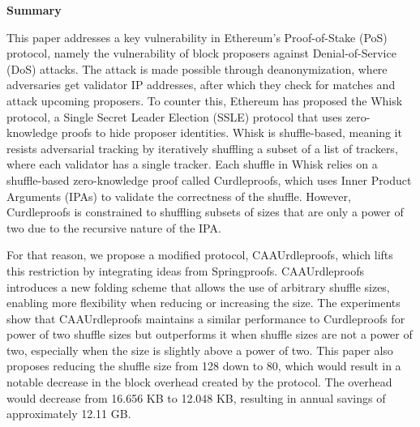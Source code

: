 \onecolumn     %
\thispagestyle{empty}

\begin{center}
    \begin{tcolorbox}[
        width=\dimexpr\paperwidth - 2in\relax,  %
        colback=white,                          %
        colframe=white,                         %
        left=60pt, right=60pt, top=10pt, bottom=10pt, %
        boxrule=0.8pt, %
        fontupper=\large
    ]
        \textbf{\large Summary}%

        This paper addresses a key vulnerability in Ethereum’s Proof-of-Stake (PoS) protocol, namely the vulnerability of block proposers against Denial-of-Service (DoS) attacks.
        The attack is made possible through deanonymization, where adversaries get validator IP addresses, after which they check for matches and attack upcoming proposers.
        To counter this, Ethereum has proposed the Whisk protocol, a Single Secret Leader Election (SSLE) protocol that uses zero-knowledge proofs to hide proposer identities.
        Whisk is shuffle-based, meaning it resists adversarial tracking by iteratively shuffling a subset of a list of trackers, where each validator has a single tracker.
        Each shuffle in Whisk relies on a shuffle-based zero-knowledge proof called Curdleproofs, which uses Inner Product Arguments (IPAs) to validate the correctness of the shuffle.
        However, Curdleproofs is constrained to shuffling subsets of sizes that are only a power of two due to the recursive nature of the IPA.


        For that reason, we propose a modified protocol, CAAUrdleproofs, which lifts this restriction by integrating ideas from Springproofs.
        CAAUrdleproofs introduces a new folding scheme that allows the use of arbitrary shuffle sizes, enabling more flexibility when reducing or increasing the size.
        The experiments show that CAAUrdleproofs maintains a similar performance to Curdleproofs for power of two shuffle sizes but outperforms it when shuffle sizes are not a power of two, especially when the size is slightly above a power of two.
        This paper also proposes reducing the shuffle size from 128 down to 80, which would result in a notable decrease in the block overhead created by the protocol.
        The overhead would decrease from 16.656 KB to 12.048 KB, resulting in annual savings of approximately 12.11 GB.



\end{tcolorbox}
\end{center}
